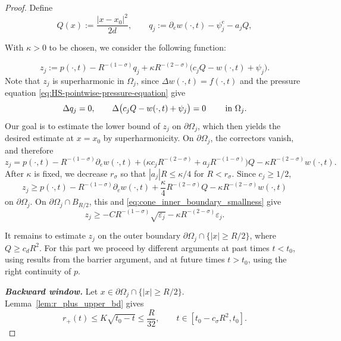\documentclass[10pt,a4paper]{amsart}
\begin{document}
\begin{proof}
Define
\[
    Q(x):=\frac{|x-x_0|^2}{2d},
    \qquad
    q_j:=\partial_e w(\cdot,t)-\psi_j^e-a_jQ,
\]

With \(\kappa>0\) to be chosen,
we consider the following function:

\begin{equation}\label{eq:cone_barrier}
    z_j:=p(\cdot,t)-R^{-(1-\sigma)}q_j
    +\kappa R^{-(2-\sigma)}\bigl(c_jQ-w(\cdot,t)+\psi_j\bigr).
\end{equation}
Note that $z_j$ is superharmonic in $\Omega_j$, since  \(\Delta w(\cdot,t)=f(\cdot,t)\) and
the pressure equation \eqref{eq:HS-pointwise-pressure-equation}
give
\[
    \Delta q_j=0,
    \qquad
    \Delta\bigl(c_jQ-w(\cdot,t)+\psi_j\bigr)=0 \qquad \hbox{ in } \Omega_j.
\]
Our goal is to estimate the lower bound of $z_j$ on $\partial\Omega_j$, which then yields the desired estimate at $x=x_0$ by superharmonicity.
On \(\partial\Omega_j\), the correctors vanish, and therefore
\[
    z_j=p(\cdot,t)-R^{-(1-\sigma)}\partial_e w(\cdot,t)
    +\bigl(\kappa c_jR^{-(2-\sigma)}+a_jR^{-(1-\sigma)}\bigr)Q
    -\kappa R^{-(2-\sigma)}w(\cdot,t).
\]
After \(\kappa\) is fixed, we decrease \(r_\sigma\) so that
\(|a_j|R\leq\kappa/4\) for \(R<r_\sigma\). Since \(c_j\geq1/2\),
\begin{equation}\label{eq:cone_boundary_common}
    z_j\geq p(\cdot,t)-R^{-(1-\sigma)}\partial_e w(\cdot,t)
    +\frac{\kappa}{4}R^{-(2-\sigma)}Q
    -\kappa R^{-(2-\sigma)}w(\cdot,t)
\end{equation}
on \(\partial\Omega_j\). On \(\partial\Omega_j\cap B_{R/2}\), this and
\eqref{eq:cone_inner_boundary_smallness} give
\begin{equation}\label{eq:cone_inner_boundary_zj}
    z_j\geq
    -CR^{-(1-\sigma)}\sqrt{\varepsilon_j}
    -\kappa R^{-(2-\sigma)}\varepsilon_j.
\end{equation}

It remains to estimate \(z_j\) on the outer boundary 
\(\partial\Omega_j\cap\{|x|\geq R/2\}\), where $Q\geq c_dR^2$. For this part we proceed by different arguments at past times $t<t_0$, using results from the barrier argument, and at future times $t>t_0$, using the right continuity of $p$. 


\textbf{\emph{Backward window.}}
Let $x\in \partial\Omega_j\cap \{|x|\geq R/2\}$.
Lemma~\ref{lem:r_plus_upper_bd} gives
\begin{equation}\label{eq:cone_r_plus_small_on_window}
    r_+(t)\leq K\sqrt{t_0-t}\leq \frac{R}{32},
    \qquad t\in[t_0-c_\sigma R^2,t_0].
\end{equation}


\end{proof}
\end{document}
